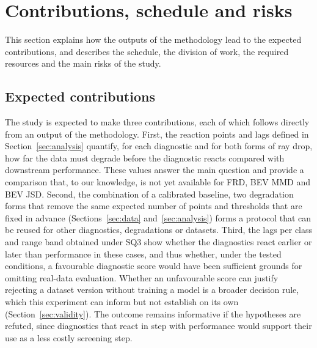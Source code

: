 \section{Contributions, schedule and risks}\label{sec:plan}
This section explains how the outputs of the methodology lead to the expected contributions, and describes the schedule, the division of work, the required resources and the main risks of the study.

\subsection{Expected contributions}\label{sec:contributions}
The study is expected to make three contributions, each of which follows directly from an output of the methodology. First, the reaction points and lags defined in Section~\ref{sec:analysis} quantify, for each diagnostic and for both forms of ray drop, how far the data must degrade before the diagnostic reacts compared with downstream performance. These values answer the main question and provide a comparison that, to our knowledge, is not yet available for FRD, BEV MMD and BEV JSD. Second, the combination of a calibrated baseline, two degradation forms that remove the same expected number of points and thresholds that are fixed in advance (Sections~\ref{sec:data} and~\ref{sec:analysis}) forms a protocol that can be reused for other diagnostics, degradations or datasets. Third, the lags per class and range band obtained under SQ3 show whether the diagnostics react earlier or later than performance in these cases, and thus whether, under the tested conditions, a favourable diagnostic score would have been sufficient grounds for omitting real-data evaluation. Whether an unfavourable score can justify rejecting a dataset version without training a model is a broader decision rule, which this experiment can inform but not establish on its own (Section~\ref{sec:validity}). The outcome remains informative if the hypotheses are refuted, since diagnostics that react in step with performance would support their use as a less costly screening step.

